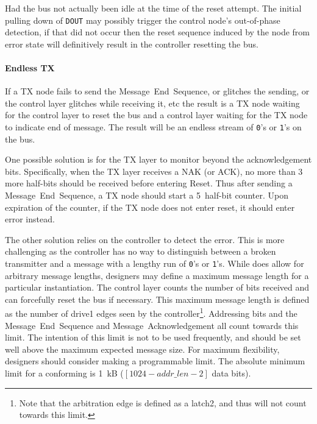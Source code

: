 Had the bus not actually been idle at the time of the reset attempt. The
initial pulling down of {\tt DOUT} may possibly trigger the control node's
out-of-phase detection, if that did not occur then the reset sequence induced
by the node from {\sc error} state will definitively result in the controller
resetting the bus.

\paragraph{Endless TX}
If a TX node fails to send the Message~End~Sequence, or glitches the sending,
or the control layer glitches while receiving it, etc the result is a TX node
waiting for the control layer to reset the bus and a control layer waiting for
the TX node to indicate end of message. The result will be an endless stream
of {\tt 0}'s or {\tt 1}'s on the bus.

One possible solution is for the TX layer to monitor beyond the
acknowledgement bits. Specifically, when the TX layer receives a NAK (or ACK),
no more than 3 more half-bits should be received before entering Reset. Thus
after sending a Message~End~Sequence, a TX node should start a 5~half-bit
counter. Upon expiration of the counter, if the TX node does not enter {\sc
reset}, it should enter {\sc error} instead.

The other solution relies on the controller to detect the error. This is
more challenging as the controller has no way to distinguish between a broken
transmitter and a message with a lengthy run of {\tt 0}'s or {\tt 1}'s. While
\bus does allow for arbitrary message lengths, designers may define a maximum
message length for a particular \bus instantiation. The control layer counts
the number of bits received and can forcefully reset the bus if necessary.
This maximum message length is defined as the number of {\sc drive1} edges
seen by the controller\footnote{
  Note that the arbitration edge is defined as a {\sc latch2}, and thus will
  not count towards this limit.
}. Addressing bits and the Message~End~Sequence and Message~Acknowledgement
all count towards this limit. The intention of this limit is not to be used
frequently, and should be set well above the maximum expected message size.
For maximum flexibility, designers should consider making a programmable
limit. The absolute minimum limit for a conforming \bus is 1~kB ($[1024 -
addr\_len - 2]$ data bits).
